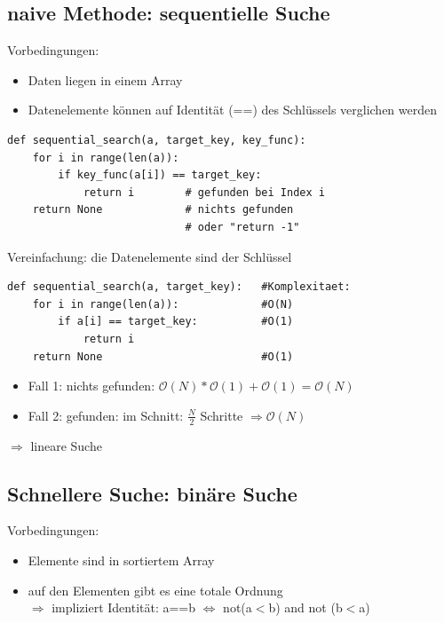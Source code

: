\documentclass[11pt, fleqn]{scrreprt}
\newcommand{\bigO}[0]{\mathcal{O}}
\begin{document}
\subsection*{naive Methode: sequentielle Suche}
Vorbedingungen:
\begin{itemize}
    \item Daten liegen in einem Array
    \item Datenelemente können auf Identität (==) des Schlüssels verglichen werden
\end{itemize}

\begin{verbatim}
def sequential_search(a, target_key, key_func):
    for i in range(len(a)):
        if key_func(a[i]) == target_key:
            return i        # gefunden bei Index i
    return None             # nichts gefunden
                            # oder "return -1"
    \end{verbatim}

    Vereinfachung: die Datenelemente sind der Schlüssel

    \begin{verbatim}
def sequential_search(a, target_key):   #Komplexitaet:
    for i in range(len(a)):             #O(N)
        if a[i] == target_key:          #O(1)
            return i
    return None                         #O(1)
        \end{verbatim}
        \begin{itemize}
            \item Fall 1: nichts gefunden: $\bigO{}(N) * \bigO{}(1) + \bigO{}(1) = \bigO{}(N)$
            \item Fall 2: gefunden: im Schnitt: $\frac{N}{2}$ Schritte $\Rightarrow \bigO{}(N)$
        \end{itemize}
        $\Rightarrow$ \glqq lineare Suche\grqq

        \subsection*{Schnellere Suche: binäre Suche}
        Vorbedingungen:
        \begin{itemize}
            \item Elemente sind in sortiertem Array
            \item auf den Elementen gibt es eine totale Ordnung \\
            $\Rightarrow$ impliziert Identität: a==b $\Leftrightarrow$ not(a$<$b) and not (b$<$a)
        \end{itemize}
\end{document}
